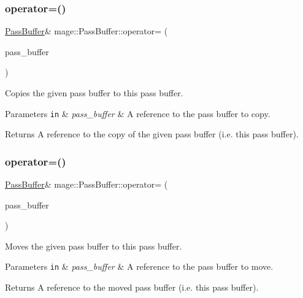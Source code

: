 \subsubsection{\texorpdfstring{operator=()}{operator=()}\hspace{0.1cm}{\footnotesize\ttfamily [1/2]}}
{\footnotesize\ttfamily \hyperlink{structmage_1_1_pass_buffer}{Pass\+Buffer}\& mage\+::\+Pass\+Buffer\+::operator= (\begin{DoxyParamCaption}\item[{const \hyperlink{structmage_1_1_pass_buffer}{Pass\+Buffer} \&}]{pass\+\_\+buffer }\end{DoxyParamCaption})\hspace{0.3cm}{\ttfamily [delete]}}

Copies the given pass buffer to this pass buffer.


\begin{DoxyParams}[1]{Parameters}
\mbox{\tt in}  & {\em pass\+\_\+buffer} & A reference to the pass buffer to copy. \\
\hline
\end{DoxyParams}
\begin{DoxyReturn}{Returns}
A reference to the copy of the given pass buffer (i.\+e. this pass buffer). 
\end{DoxyReturn}
\hypertarget{structmage_1_1_pass_buffer_a8a5832066c415bea077107c7a9d18df5}{}\label{structmage_1_1_pass_buffer_a8a5832066c415bea077107c7a9d18df5} 
\subsubsection{\texorpdfstring{operator=()}{operator=()}\hspace{0.1cm}{\footnotesize\ttfamily [2/2]}}
{\footnotesize\ttfamily \hyperlink{structmage_1_1_pass_buffer}{Pass\+Buffer}\& mage\+::\+Pass\+Buffer\+::operator= (\begin{DoxyParamCaption}\item[{\hyperlink{structmage_1_1_pass_buffer}{Pass\+Buffer} \&\&}]{pass\+\_\+buffer }\end{DoxyParamCaption})\hspace{0.3cm}{\ttfamily [delete]}}

Moves the given pass buffer to this pass buffer.


\begin{DoxyParams}[1]{Parameters}
\mbox{\tt in}  & {\em pass\+\_\+buffer} & A reference to the pass buffer to move. \\
\hline
\end{DoxyParams}
\begin{DoxyReturn}{Returns}
A reference to the moved pass buffer (i.\+e. this pass buffer). 
\end{DoxyReturn}
\hypertarget{structmage_1_1_pass_buffer_a818fda1e63507217e0e852935ad172fb}{}\label{structmage_1_1_pass_buffer_a818fda1e63507217e0e852935ad172fb} 
